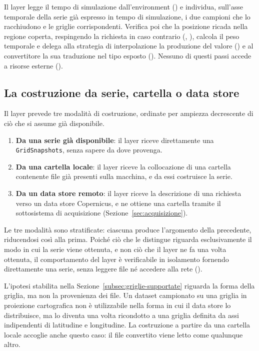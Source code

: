 Il layer legge il tempo di simulazione dall'environment () e individua,
sull'asse temporale della serie già espresso in tempo di simulazione, i due campioni che
lo racchiudono e le griglie corrispondenti. Verifica poi che la posizione ricada nella
regione coperta, respingendo la richiesta in caso contrario (, ), calcola
il peso temporale e delega alla strategia di interpolazione la produzione del valore ()
e al convertitore la sua traduzione nel tipo esposto (). Nessuno di questi passi accede
a risorse esterne ().

\FloatBarrier

\subsection{La costruzione da serie, cartella o data store}
\label{subsec:layer-costruzione}

Il layer prevede tre modalità di costruzione, ordinate per ampiezza decrescente di ciò che
si assume già disponibile.

\begin{enumerate}
    \item \textbf{Da una serie già disponibile}: il layer riceve direttamente una
    \texttt{GridSnapshots}, senza sapere da dove provenga.
    \item \textbf{Da una cartella locale}: il layer riceve la collocazione di una cartella
    contenente file già presenti sulla macchina, e da essi costruisce la serie.
    \item \textbf{Da un data store remoto}: il layer riceve la descrizione di una richiesta verso un
    data store Copernicus, e ne ottiene una cartella tramite il sottosistema di
    acquisizione (Sezione~\ref{sec:acquisizione}).
\end{enumerate}

Le tre modalità sono stratificate: ciascuna produce l'argomento della precedente,
riducendosi così alla prima. Poiché ciò che le distingue riguarda
esclusivamente il modo in cui la serie viene ottenuta, e non ciò che il layer ne
fa una volta ottenuta, il comportamento del layer è verificabile in isolamento
fornendo direttamente una serie, senza leggere file né accedere alla rete ().

\iffalse
L'ipotesi stabilita nella Sezione~\ref{subsec:griglie-supportate} riguarda la forma della griglia,
ma non la provenienza dei file. Un dataset campionato su una griglia in proiezione
cartografica non è utilizzabile nella forma in cui il data store lo distribuisce,
ma lo diventa una volta ricondotto a una griglia definita da assi indipendenti di
latitudine e longitudine. La costruzione a partire da una cartella locale accoglie anche
questo caso: il file convertito viene letto come qualunque altro.


